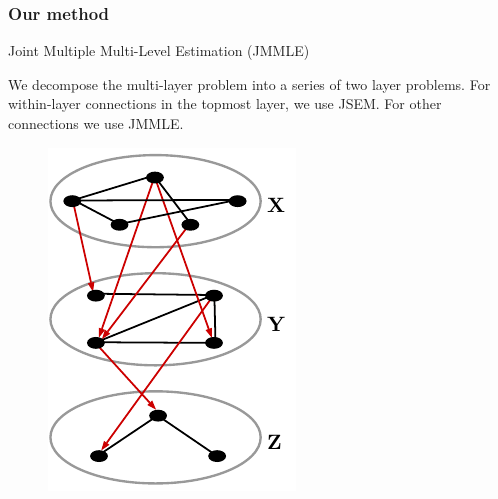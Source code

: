 \documentclass[10pt]{beamer}
\theoremstyle{definition}
\begin{document}
\begin{frame}
\frametitle{Our method}

\begin{center}
{\colrbf Joint Multiple Multi-Level Estimation (JMMLE)}
\end{center}

\vspace{1em}
We decompose the multi-layer problem into a series of two layer problems. For within-layer connections in the topmost layer, we use JSEM. For other connections we use JMMLE. 
%
\begin{figure}
\centering
\includegraphics[width=.9\textwidth]{multilayer}
\end{figure}
\end{frame}
\end{document}
